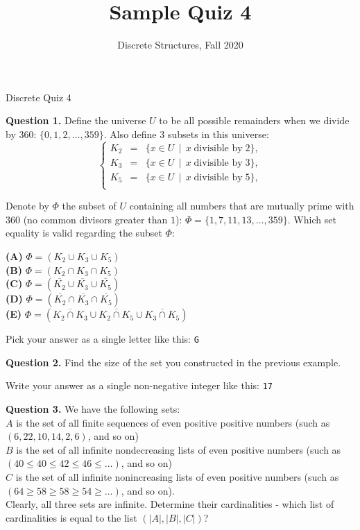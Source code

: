 \documentclass[jou]{apa6}
\title{Sample Quiz 4}
\author{Discrete Structures, Fall 2020}
\affiliation{RBS}
\begin{document}
\thispagestyle{empty}

\twocolumn
{\Large Discrete Quiz 4}

\vspace{10pt}
{\bf Question 1.} Define the universe $U$ to be all possible remainders 
when we divide by $360$: $\{ 0, 1, 2, \ldots, 359 \}$. 
Also define $3$ subsets in this universe: 
$$\left\{ \begin{array}{rcl}
K_2 & = & \{ x \in U \,\mid\, x\;\text{divisible by}\;2 \},\\
K_3 & = & \{ x \in U \,\mid\, x\;\text{divisible by}\;3 \},\\
K_5 & = & \{ x \in U \,\mid\, x\;\text{divisible by}\;5 \},\\
\end{array} \right.$$

Denote by $\Phi$ the subset of $U$ containing all numbers
that are mutually prime with $360$ (no common divisors greater than $1$):
$\Phi = \{1,7,11,13,\ldots,359\}$.
Which set equality is valid regarding the subset $\Phi$:

\noindent
{\bf (A)} $\Phi = \left( K_2 \cup K_3 \cup K_5 \right)$\\
{\bf (B)} $\Phi = \left( K_2 \cap K_3 \cap K_5 \right)$\\
{\bf (C)} $\Phi = \left( \overline{K_2} \cup \overline{K_3} \cup \overline{K_5} \right)$\\
{\bf (D)} $\Phi = \left( \overline{K_2} \cap \overline{K_3} \cap \overline{K_5} \right)$\\
{\bf (E)} $\Phi = \left( \overline{K_2 \cap K_3} \cup \overline{K_2 \cap K_5} \cup \overline{K_3 \cap K_5} \right)$


Pick your answer as a single letter like this: {\tt G}

\vspace{6pt}
{\bf Question 2.}
Find the size of the set you constructed in the previous example. 

Write your answer as a single non-negative integer like this: {\tt 17}


\vspace{6pt}
{\bf Question 3.} We have the following sets:\\
$A$ is the set of all finite sequences of even positive positive numbers (such as $(6,22,10,14,2,6)$, and so on)\\
$B$ is the set of all infinite nondecreasing lists of even positive numbers (such as $(40 \leq 40 \leq 42 \leq 46 \leq \ldots)$, and so on)\\
$C$ is the set of all infinite nonincreasing lists of even positive numbers (such as $(64 \geq 58 \geq 58 \geq 54 \geq \ldots)$, and so on).\\
Clearly, all three sets are infinite. Determine their cardinalities - which list 
of cardinalities is equal to the list  $(|A|,|B|,|C|)$?
\end{document}
